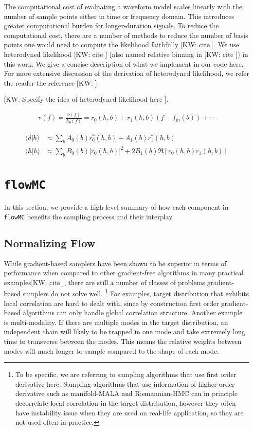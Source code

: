 \documentclass[twocolumn]{aastex631}
\newcommand{\kw}[1]{{\color{rb4}[KW: #1 ]}}
\begin{document}
The computational cost of evaluating a waveform model scales linearly with the
number of sample points either in time or frequency domain. This introduces
greater computational burden for longer-duration signals. To reduce the
computational cost, there are a number of methods to reduce the number of basis
points one would need to compute the likelihood faithfully \kw{cite}. We use
heterodyned likelihood \kw{cite} (also named relative binning in \kw{cite}) in
this work. We give a concise description of what we implement in our code here.
For more extensive discussion of the derivation of heterodyned likelihood, we
refer the reader the reference \kw{}.

\kw{Specify the idea of heterodyned likelihood here}.

\begin{align}
r(f) = \frac{h(f)}{h_0(f)} = r_0(h,b) + r_1(h,b)(f- f_m(b)) + \cdots
\end{align}

\begin{align}
    \langle d|h \rangle &\approx \sum_b A_0(b) r^*_0(h,b) + A_1(b) r^*_1(h,b) \nonumber \\
    \langle h|h \rangle &\approx \sum_b B_0(b) |r_0(h,b)|^2 + 2 B_1(b) \Re[r_0(h,b)r_1(h,b)]
\end{align}

\section{\texttt{flowMC}}
\label{sec: flowMC}

In this section, we provide a high level summary of how each component in
\texttt{flowMC} benefits the sampling process and their interplay.


\subsection{Normalizing Flow}
\label{sec:flow}

While gradient-based samplers have been shown to be superior in terms of
performance when compared to other gradient-free algorithms in many practical
examples\kw{cite}, there are still a number of classes of problems
gradient-based samplers do not solve well. \footnote{To be specific, we are
referring to sampling algorithms that use first order derivative here. Sampling
algorithms that use information of higher order derivative such as manifold-MALA
and Riemannian-HMC can in principle decorrelate local correlation in the target
distribution, however they often have instability issue when they are used on
real-life application, so they are not used often in practice.} For examples,
target distribution that exhibits local correlation are hard to dealt with,
since by construction first order gradient-based algorithms can only handle
global correlation structure. Another example is multi-modality. If there are
multiple modes in the target distribution, an independent chain will likely to
be trapped in one mode and take extremely long time to transverse between the
modes. This means the relative weights between modes will much longer to sample
compared to the shape of each mode.
\end{document}
